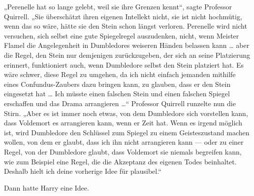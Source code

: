 „Perenelle hat so lange gelebt, weil sie ihre Grenzen kennt“, sagte Professor Quirrell.
„Sie überschätzt ihren eigenen Intellekt nicht, sie ist nicht hochmütig, wenn das so wäre, hätte sie den Stein schon längst verloren. Perenelle wird nicht versuchen, sich selbst eine gute Spiegelregel auszudenken, nicht, wenn Meister Flamel die Angelegenheit in Dumbledores weiseren Händen belassen kann … aber die Regel, den Stein nur demjenigen zurückzugeben, der sich an seine Platzierung erinnert, funktioniert auch, wenn Dumbledore selbst den Stein platziert hat. Es wäre schwer, diese Regel zu umgehen, da ich nicht einfach jemanden mithilfe eines Confundus-Zaubers dazu bringen kann, zu glauben, dass er den Stein eingesetzt hat … Ich müsste einen falschen Stein und einen falschen Spiegel erschaffen und das Drama arrangieren …“
Professor Quirrell runzelte nun die Stirn.
„Aber es ist immer noch etwas, von dem Dumbledore sich vorstellen kann, dass Voldemort es arrangieren kann, wenn er Zeit hat. Wenn es irgend möglich ist, wird Dumbledore den Schlüssel zum Spiegel zu einem Geisteszustand machen wollen, von dem er glaubt, dass ich ihn nicht arrangieren kann — oder zu einer Regel, von der Dumbledore glaubt, dass Voldemort sie niemals begreifen kann, wie zum Beispiel eine Regel, die die Akzeptanz des eigenen Todes beinhaltet. Deshalb hielt ich deine vorherige Idee für plausibel.“

Dann hatte Harry eine Idee.

